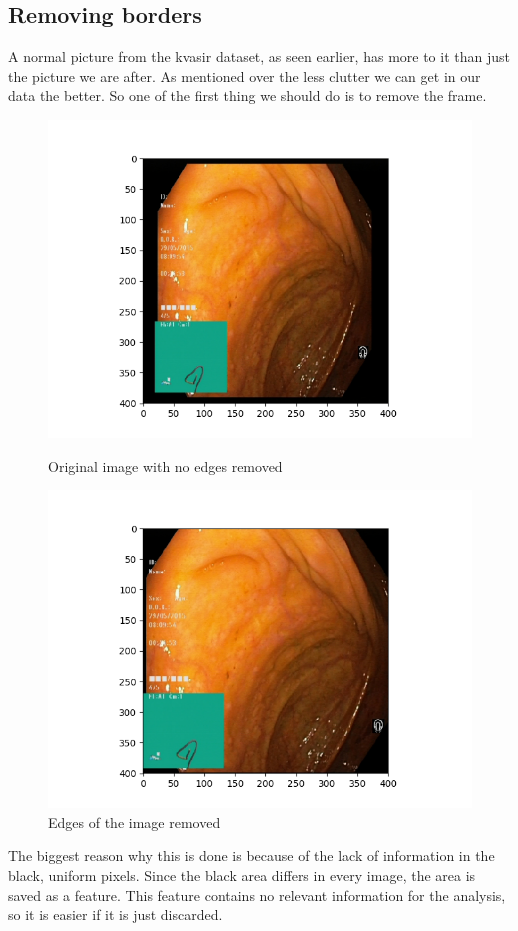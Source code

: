   \subsection{Removing borders}
    A normal picture from the kvasir dataset, as seen earlier, has more to it than just the picture we are after.
    As mentioned over the less clutter we can get in our data the better. So one of the first thing we should do is to remove the frame.
    \begin{figure}[ht]
      \centering
      \begin{minipage}[b]{0.45\textwidth}
	\includegraphics[width=\textwidth]{methods/figures/No_crop.png}
	\caption{Original image with no edges removed}
      \end{minipage}
      \hfill
      \begin{minipage}[b]{0.45\textwidth}
	\includegraphics[width=\textwidth]{methods/figures/Crop.png}
	\caption{Edges of the image removed}
      \end{minipage}
    \end{figure}
    The biggest reason why this is done is because of the lack of information in the black, uniform pixels. Since the 
    black area differs in every image, the area is saved as a feature. This feature contains no relevant information for the analysis,
    so it is easier if it is just discarded. \\
    
